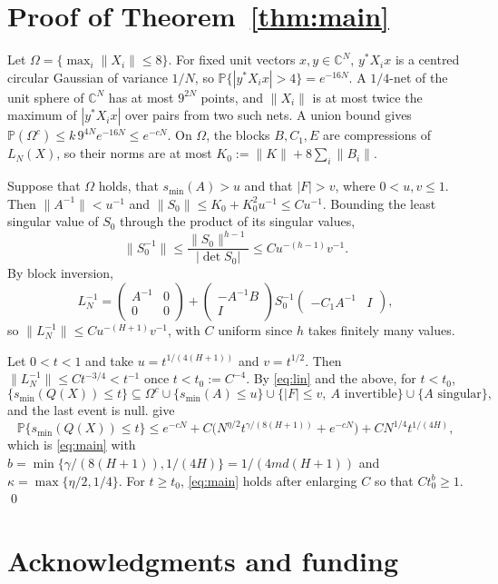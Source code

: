 \documentclass[11pt]{article}
\theoremstyle{remark}
\newcommand{\C}{\mathbb C}
\newcommand{\Prob}{\mathbb P}
\newcommand{\smin}{s_{\min}}
\begin{document}
\section{Proof of Theorem~\ref{thm:main}}\label{sec:proof}

Let $\Omega=\{\max_i\|X_i\|\le8\}$. For fixed unit vectors $x,y\in\C^N$, $y^*X_ix$ is a centred circular Gaussian of variance $1/N$, so $\Prob\{|y^*X_ix|>4\}=e^{-16N}$. A $1/4$-net of the unit sphere of $\C^N$ has at most $9^{2N}$ points, and $\|X_i\|$ is at most twice the maximum of $|y^*X_ix|$ over pairs from two such nets. A union bound gives $\Prob(\Omega^c)\le k\,9^{4N}e^{-16N}\le e^{-cN}$. On $\Omega$, the blocks $B,C_1,E$ are compressions of $L_N(X)$, so their norms are at most $K_0:=\|K\|+8\sum_i\|B_i\|$.

Suppose that $\Omega$ holds, that $\smin(A)>u$ and that $|F|>v$, where $0<u,v\le1$. Then $\|A^{-1}\|<u^{-1}$ and $\|S_0\|\le K_0+K_0^2u^{-1}\le C u^{-1}$. Bounding the least singular value of $S_0$ through the product of its singular values,
\[
\|S_0^{-1}\|\le\frac{\|S_0\|^{h-1}}{|\det S_0|}\le Cu^{-(h-1)}v^{-1}.
\]
By block inversion,
\[
L_N^{-1}=\begin{pmatrix}A^{-1}&0\\0&0\end{pmatrix}+\begin{pmatrix}-A^{-1}B\\ I\end{pmatrix}S_0^{-1}\begin{pmatrix}-C_1A^{-1}&I\end{pmatrix},
\]
so $\|L_N^{-1}\|\le Cu^{-(H+1)}v^{-1}$, with $C$ uniform since $h$ takes finitely many values.

Let $0<t<1$ and take $u=t^{1/(4(H+1))}$ and $v=t^{1/2}$. Then $\|L_N^{-1}\|\le Ct^{-3/4}<t^{-1}$ once $t<t_0:=C^{-4}$. By \eqref{eq:lin} and the above, for $t<t_0$,
\[
\{\smin(Q(X))\le t\}\subseteq\Omega^c\cup\{\smin(A)\le u\}\cup\{|F|\le v,\ A\text{ invertible}\}\cup\{A\text{ singular}\},
\]
and the last event is null.  give
\[
\Prob\{\smin(Q(X))\le t\}\le e^{-cN}+C\bigl(N^{\eta/2}t^{\gamma/(8(H+1))}+e^{-cN}\bigr)+CN^{1/4}t^{1/(4H)} ,
\]
which is \eqref{eq:main} with $b=\min\{\gamma/(8(H+1)),1/(4H)\}=1/(4md(H+1))$ and $\kappa=\max\{\eta/2,1/4\}$. For $t\ge t_0$, \eqref{eq:main} holds after enlarging $C$ so that $Ct_0^b\ge1$. \qed


\section*{Acknowledgments and funding}
\end{document}
